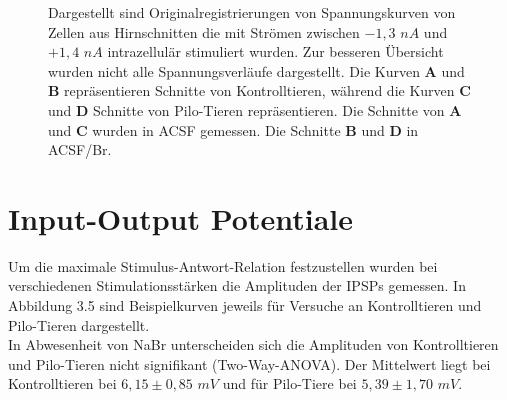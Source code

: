 \documentclass[a4paper,11pt]{report}
\begin{document}
{\begin{figure} [H]
\begin{center}
\caption{Dargestellt sind Originalregistrierungen von Spannungskurven von Zellen aus Hirnschnitten die mit Strömen zwischen $-1,3$ $nA$ und $+1,4$ $nA$ intrazellulär stimuliert wurden. Zur besseren Übersicht wurden nicht alle Spannungsverläufe dargestellt. Die Kurven \textbf{A} und \textbf{B} repräsentieren Schnitte von Kontrolltieren, während die Kurven \textbf{C} und \textbf{D} Schnitte von Pilo-Tieren repräsentieren. Die Schnitte von \textbf{A} und \textbf{C} wurden in ACSF gemessen. Die Schnitte \textbf{B} und \textbf{D} in ACSF/Br.}
\end{center}
\end{figure}






\section{Input-Output Potentiale}
Um die maximale Stimulus-Antwort-Relation festzustellen wurden bei verschiedenen Stimulationsstärken die Amplituden der IPSPs gemessen. In Abbildung 3.5 sind Beispielkurven jeweils für Versuche an Kontrolltieren und Pilo-Tieren dargestellt.\\


In Abwesenheit von NaBr unterscheiden sich die Amplituden von Kontrolltieren und Pilo-Tieren nicht signifikant (Two-Way-ANOVA). Der Mittelwert liegt bei Kontrolltieren bei $6,15 \pm 0,85$ $mV$ und für Pilo-Tiere bei $5,39 \pm 1,70$ $mV$.\\

}
\end{document}
